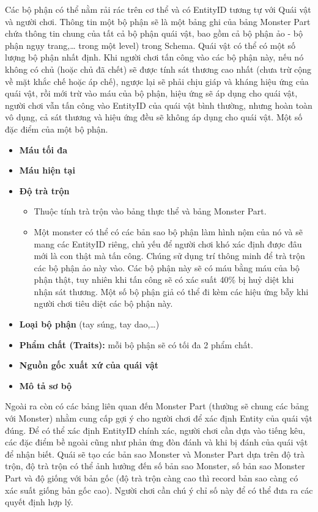 \hspace*{1cm} Các bộ phận có thể nằm rải rác trên cơ thể và có EntityID tương tự với Quái vật và người chơi. Thông tin một bộ phận sẽ là một bảng ghi của bảng Monster Part chứa thông tin chung của tất cả bộ phận quái vật, bao gồm cả bộ phận ảo - bộ phận ngụy trang,… trong một level) trong Schema. Quái vật có thể có một số lượng bộ phận nhất định. Khi người chơi tấn công vào các bộ phận này, nếu nó không có chủ (hoặc chủ đã chết) sẽ được tính sát thương cao nhất (chưa trừ cộng về mặt khắc chế hoặc áp chế), ngược lại sẽ phải chịu giáp và kháng hiệu ứng của quái vật, rồi mới trừ vào máu của bộ phận, hiệu ứng sẽ áp dụng cho quái vật, người chơi vẫn tấn công vào EntityID của quái vật bình thường, nhưng hoàn toàn vô dụng, cả sát thương và hiệu ứng đều sẽ không áp dụng cho quái vật. Một số đặc điểm của một bộ phận. \\
\begin{itemize}
	\item \textbf{Máu tối đa}
	\item \textbf{Máu hiện tại}
	\item \textbf{Độ trà trộn}
	\begin{itemize}
		\item Thuộc tính trà trộn vào bảng thực thể và bảng Monster Part.
		\item Một monster có thể có các bản sao bộ phận làm hình nộm của nó và sẽ mang các EntityID riêng, chủ yếu để người chơi khó xác định được đâu mới là con thật mà tấn công. Chúng sử dụng trí thông minh để trà trộn các bộ phận ảo này vào. Các bộ phận này sẽ có máu bằng máu của bộ phận thật, tuy nhiên khi tấn công sẽ có xác suất 40\% bị huỷ diệt khi nhận sát thương. Một số bộ phận giả có thể đi kèm các hiệu ứng bẫy khi người chơi tiêu diệt các bộ phận này.
	\end{itemize}
	\item \textbf{Loại bộ phận} (tay súng, tay dao,…)
	\item \textbf{Phẩm chất (Traits):} mỗi bộ phận sẽ có tối đa 2 phẩm chất.
	\item \textbf{Nguồn gốc xuất xứ của quái vật}
	\item \textbf{Mô tả sơ bộ}
\end{itemize}
\hspace*{1cm} Ngoài ra còn có các bảng liên quan đến Monster Part (thường sẽ chung các bảng với Monster) nhằm cung cấp gợi ý cho người chơi để xác định Entity của quái vật đúng. Để có thể xác định EntityID chính xác, người chơi cần dựa vào tiếng kêu, các đặc điểm bề ngoài cũng như phản ứng đòn đánh và khi bị đánh của quái vật để nhận biết.
\hspace*{1cm} Quái sẽ tạo các bản sao Monster và Monster Part dựa trên độ trà trộn, độ trà trộn có thể ảnh hưởng đến số bản sao Monster, số bản sao Monster Part và độ giống với bản gốc (độ trà trộn càng cao thì record bản sao càng có xác suất giống bản gốc cao). Người chơi cần chú ý chỉ số này để có thể đưa ra các quyết định hợp lý.
